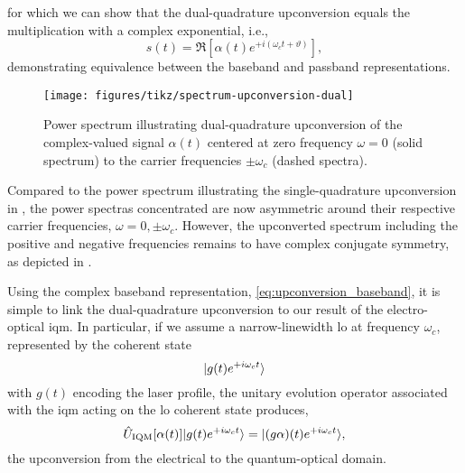 for which we can show that the dual-quadrature upconversion equals the multiplication with a complex exponential, i.e.,
\begin{equation}
	s(t)
	=
	\Re
	\left[
		\alpha(t)
		e^{+i(\omega_c t+\vartheta)}
	\right]
	,
\end{equation}
demonstrating equivalence between the baseband and passband representations.
\begin{figure}[htb]
	\centering
	\texttt{[image: figures/tikz/spectrum-upconversion-dual]}
	\caption{Power spectrum illustrating dual-quadrature upconversion of the complex-valued signal $\alpha(t)$ centered at zero frequency $\omega=0$ (solid spectrum) to the carrier frequencies $\pm\omega_c$ (dashed spectra).}\label{fig:spectrum_upconversion_dual}
\end{figure}
Compared to the power spectrum illustrating the single-quadrature upconversion in , the power spectras concentrated are now asymmetric around their respective carrier frequencies, $\omega=0,\pm\omega_c$.
However, the upconverted spectrum including the positive and negative frequencies remains to have complex conjugate symmetry, as depicted in .

Using the complex baseband representation, \cref{eq:upconversion_baseband}, it is simple to link the dual-quadrature upconversion to our result of the electro-optical \gls{iqm}.
In particular, if we assume a narrow-linewidth \gls{lo} at frequency $\omega_c$, represented by the coherent state
\begin{equation}
	\lvert g(t)e^{+i\omega_ct}\rangle
\end{equation}
with $g(t)$ encoding the laser profile, the unitary evolution operator associated with the \gls{iqm} acting on the \gls{lo} coherent state produces,
\begin{equation}
	\hat{U}_\text{IQM}[\alpha(t)]
	\lvert g(t)e^{+i\omega_ct}\rangle
	=
	\lvert(g\alpha)(t)e^{+i\omega_ct}\rangle
	,
\end{equation}
the upconversion from the electrical to the quantum-optical domain.